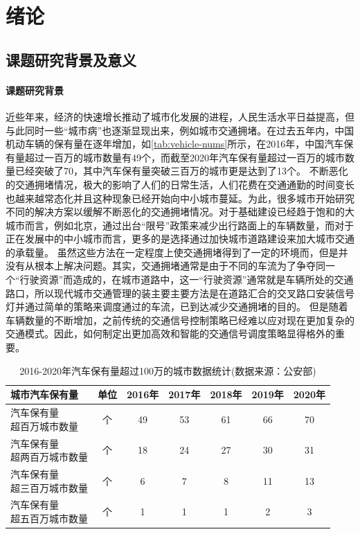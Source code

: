 
\chapter{绪论}
\section{课题研究背景及意义}
\subsubsection{课题研究背景}
近些年来，经济的快速增长推动了城市化发展的进程，人民生活水平日益提高，但与此同时一些“城市病”也逐渐显现出来，例如城市交通拥堵。在过去五年内，中国机动车辆的保有量在逐年增加，如\autoref{tab:vehicle-nums}所示，在2016年，中国汽车保有量超过一百万的城市数量有49个，而截至2020年汽车保有量超过一百万的城市数量已经突破了70，其中汽车保有量突破三百万的城市更是达到了13个。
不断恶化的交通拥堵情况，极大的影响了人们的日常生活，人们花费在交通通勤的时间变长也越来越常态化并且这种现象已经开始向中小城市蔓延。为此，很多城市开始研究不同的解决方案以缓解不断恶化的交通拥堵情况。对于基础建设已经趋于饱和的大城市而言，例如北京，通过出台“限号”政策来减少出行路面上的车辆数量，而对于正在发展中的中小城市而言，更多的是选择通过加快城市道路建设来加大城市交通的承载量。
虽然这些方法在一定程度上使交通拥堵得到了一定的环境而，但是并没有从根本上解决问题。其实，交通拥堵通常是由于不同的车流为了争夺同一个“行驶资源”而造成的，在城市道路中，这一“行驶资源”通常就是车辆所处的交通路口，所以现代城市交通管理的装主要主要方法是在道路汇合的交叉路口安装信号灯并通过简单的策略来调度通过的车流，已到达减少交通拥堵的目的。
但是随着车辆数量的不断增加，之前传统的交通信号控制策略已经难以应对现在更加复杂的交通模式。因此，如何制定出更加高效和智能的交通信号调度策略显得格外的重要。

\begin{table}[htb]
    \caption{2016-2020年汽车保有量超过100万的城市数据统计(数据来源：公安部)\label{tab:vehicle-nums}}
    \begin{tabular}{lcccccc}
      \toprule
      城市汽车保有量 & 单位 & 2016年 & 2017年 & 2018年 & 2019年 & 2020年 \\
      \midrule
      \tabincell{l}{汽车保有量\\超百万城市数量} & 个 & 49 & 53 & 61 & 66 & 70 \\
      \hline
      \tabincell{l}{汽车保有量\\超两百万城市数量} & 个 & 18 & 24 & 27 & 30 & 31 \\
      \hline
      \tabincell{l}{汽车保有量\\超三百万城市数量} & 个 & 6  & 7 & 8 & 11 & 13 \\
      \hline
      \tabincell{l}{汽车保有量\\超五百万城市数量} & 个 & 1  & 1 & 1 & 2 & 3 \\
      \bottomrule
    \end{tabular}
\end{table}


